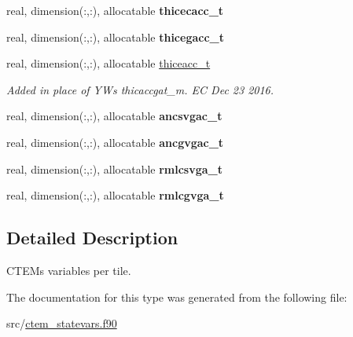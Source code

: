 \begin{DoxyCompactItemize}
\item 
\hypertarget{structctem__statevars_1_1ctem__tile__level_ad9c17e1ed9202f7bc2aebacf0941fee9}{}real, dimension(\+:,\+:), allocatable {\bfseries thicecacc\+\_\+t}\label{structctem__statevars_1_1ctem__tile__level_ad9c17e1ed9202f7bc2aebacf0941fee9}

\item 
\hypertarget{structctem__statevars_1_1ctem__tile__level_ae1ad7c89b241976d45f4534377f261dc}{}real, dimension(\+:,\+:), allocatable {\bfseries thicegacc\+\_\+t}\label{structctem__statevars_1_1ctem__tile__level_ae1ad7c89b241976d45f4534377f261dc}

\item 
\hypertarget{structctem__statevars_1_1ctem__tile__level_a35fe7ee9efe130f66e95a336fb2b3a8d}{}real, dimension(\+:,\+:), allocatable \hyperlink{structctem__statevars_1_1ctem__tile__level_a35fe7ee9efe130f66e95a336fb2b3a8d}{thiceacc\+\_\+t}\label{structctem__statevars_1_1ctem__tile__level_a35fe7ee9efe130f66e95a336fb2b3a8d}

\begin{DoxyCompactList}\small\item\em Added in place of Y\+W\textquotesingle{}s thicaccgat\+\_\+m. E\+C Dec 23 2016. \end{DoxyCompactList}\item 
\hypertarget{structctem__statevars_1_1ctem__tile__level_a094415b04f0a8e73872f83c99f25dfb6}{}real, dimension(\+:,\+:), allocatable {\bfseries ancsvgac\+\_\+t}\label{structctem__statevars_1_1ctem__tile__level_a094415b04f0a8e73872f83c99f25dfb6}

\item 
\hypertarget{structctem__statevars_1_1ctem__tile__level_ac77654fed38a176a3f02ce52e1b5c172}{}real, dimension(\+:,\+:), allocatable {\bfseries ancgvgac\+\_\+t}\label{structctem__statevars_1_1ctem__tile__level_ac77654fed38a176a3f02ce52e1b5c172}

\item 
\hypertarget{structctem__statevars_1_1ctem__tile__level_a0bd8988a7c04400c7b20c38ce0c413e9}{}real, dimension(\+:,\+:), allocatable {\bfseries rmlcsvga\+\_\+t}\label{structctem__statevars_1_1ctem__tile__level_a0bd8988a7c04400c7b20c38ce0c413e9}

\item 
\hypertarget{structctem__statevars_1_1ctem__tile__level_a9fcdc79391c0928275f77352acf9f016}{}real, dimension(\+:,\+:), allocatable {\bfseries rmlcgvga\+\_\+t}\label{structctem__statevars_1_1ctem__tile__level_a9fcdc79391c0928275f77352acf9f016}

\end{DoxyCompactItemize}


\subsection{Detailed Description}
C\+T\+E\+M\textquotesingle{}s variables per tile. 

The documentation for this type was generated from the following file\+:\begin{DoxyCompactItemize}
\item 
src/\hyperlink{ctem__statevars_8f90}{ctem\+\_\+statevars.\+f90}\end{DoxyCompactItemize}

